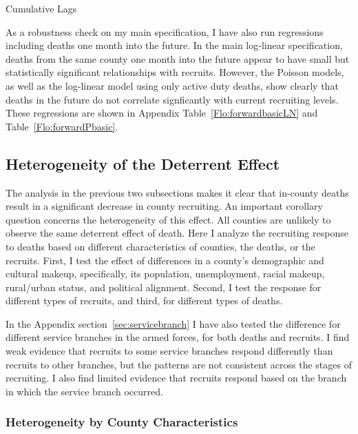 \documentclass[12pt] {article}
\begin{document}
\begin{table}
\caption{Cumulative Lags}
\label{Flo:Cumulative LagsLN}
\scalebox{0.75}{}
\end{table}

As a robustness check on my main specification, I have also run regressions including deaths one month into the future. In the main log-linear specification, deaths from the same county one month into the future appear to have small but statistically significant relationships with recruits. However, the Poisson models, as well as the log-linear model using only active duty deaths, show clearly that deaths in the future do not correlate signficantly with current recruiting levels.  These regressions are shown in Appendix Table~\ref{Flo:forwardbasicLN} and Table~\ref{Flo:forwardPbasic}. 

\subsection{Heterogeneity of the Deterrent Effect\label{sub:interactions}}

The analysis in the previous two subsections makes it clear that in-county
deaths result in a significant decrease in county recruiting. An important
corollary question concerns the heterogeneity of this effect.
All counties are unlikely to observe the same deterrent effect of
death. Here I analyze the recruiting response to deaths based
on different characteristics of counties, the deaths, or the recruits. First, I test the effect of differences in a county's demographic and cultural makeup, specifically, its population, unemployment, racial makeup, rural/urban status, and political alignment. Second, I test the response for different types of recruits, and third, for different types of deaths.

In the Appendix section~\ref{sec:servicebranch} I have also tested the difference for different service branches in the armed forces, for both deaths and recruits. I find weak evidence that recruits to some service branches respond differently than recruits to other branches, but the patterns are not consistent across the stages of recruiting. I also find limited evidence that recruits respond based on the branch in which the service branch occurred.  

\subsubsection{Heterogeneity by County Characteristics}
\end{document}
